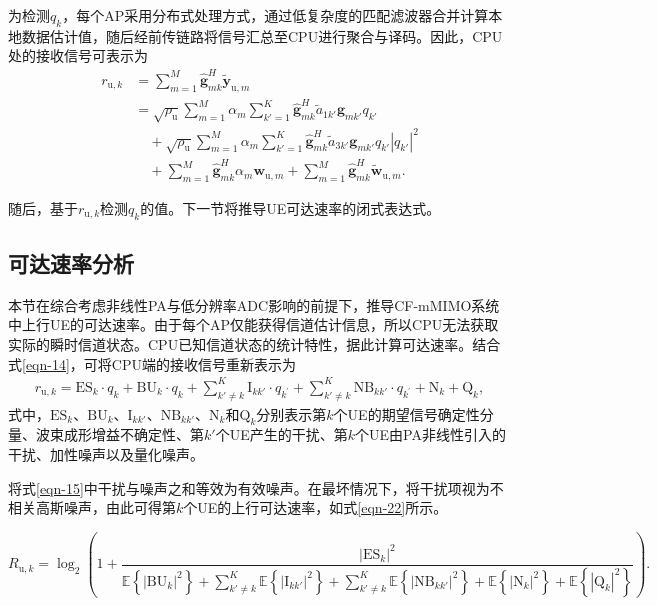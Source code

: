 为检测$q_k$，每个AP采用分布式处理方式，通过低复杂度的匹配滤波器合并计算本地数据估计值，随后经前传链路将信号汇总至CPU进行聚合与译码。因此，CPU处的接收信号可表示为
\begin{align}\label{eqn-14}
{r_{\text{u},k}} &= \sum_{m = 1}^M {\mathbf{\hat{g}}}_{mk}^H{{\tilde{\mathbf y}}_{\text{u},m}}\nonumber\\
& = \sqrt {{\rho _\text{u}}}  \sum_{m = 1}^M {\alpha _m}\sum_{k' = 1}^K {\mathbf{\hat g}}_{mk}^H{\tilde{a}_{1k'}}{{\mathbf{g}}_{mk'}}q_{k'}  
\nonumber\\& \quad+ \sqrt {{\rho _\text{u}}} \sum_{m = 1}^M {\alpha _m}\sum_{k' = 1}^K {\mathbf{\hat g}}_{mk}^H{\tilde{a}_{3k'}}{{\mathbf{g}}_{mk'}}q_{k'} {\left| {q_{k'} } \right|^2}\nonumber\\
&\quad+ \sum_{m = 1}^M {\mathbf{\hat g}}_{mk}^H{\alpha _m}{{\mathbf{w}}_{\text{u},m}} + \sum_{m = 1}^M {{\mathbf{\hat g}}^H_{mk}}{{\tilde{\mathbf w}}_{\text{u},m}}.
\end{align}	

随后，基于$r_{\text{u},k}$检测$q_k$的值。下一节将推导UE可达速率的闭式表达式。
\subsection{可达速率分析}
本节在综合考虑非线性PA与低分辨率ADC影响的前提下，推导CF-mMIMO系统中上行UE的可达速率。由于每个AP仅能获得信道估计信息，所以CPU无法获取实际的瞬时信道状态。CPU已知信道状态的统计特性，据此计算可达速率\cite{chapterthree6}。结合式\eqref{eqn-14}，可将CPU端的接收信号重新表示为
\begin{align}\label{eqn-15}
{r_{\text{u},k}} = {\text{ES}_k} \cdot {q_k} + {\text{BU}_k} \cdot {q_k} + \sum_{k' \ne k}^K {\text{I}_{kk'}} \cdot q_{k^\prime} +\sum_{k' \ne k}^K {\text{NB}_{kk'}} \cdot q_{k^\prime}  + {\text{N}_k} + {\text{Q}_k},
\end{align}
式中，$\text{ES}_k$、$\text{BU}_k$、$\text{I}_{kk'}$、$\text{NB}_{kk'}$、$\text{N}_k$和$\text{Q}_k$分别表示第$k$个UE的期望信号确定性分量、波束成形增益不确定性、第$k'$个UE产生的干扰、第$k$个UE由PA非线性引入的干扰、加性噪声以及量化噪声。

将式\eqref{eqn-15}中干扰与噪声之和等效为有效噪声。在最坏情况下，将干扰项视为不相关高斯噪声，由此可得第$k$个UE的上行可达速率，如式\eqref{eqn-22}所示。

\begin{equation}\label{eqn-22}
		{R_{\text{u},k}}= {\log _2}\left(1 + \frac{{{{\left| {{\text{ES}_k}} \right|}^2}}}{{\mathbb{E}\left \{\left |  \text{BU}_k \right | ^2 \right \}   +\sum \limits_{k'\ne k}^{K} \mathbb{E} \left \{ \left | \text{I}_{kk'} \right |^2  \right \}   +  \sum \limits_{k'\ne k}^{K}\mathbb{E}\left \{ \left |  {\text{NB}_{kk'}}  \right |^2  \right \}  +\mathbb{E} \left \{ \left | {\text{N}_k} \right |^2  \right \}   +  \mathbb{E}\left \{ \left |  \text{Q}_k\right | ^2 \right \}  } }\right).
\end{equation}

